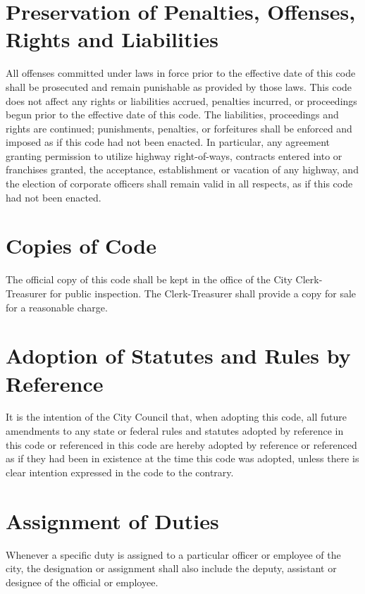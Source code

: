 \section{Preservation of Penalties, Offenses, Rights and Liabilities}
All offenses committed under laws in force prior to the effective date of this code shall be prosecuted and remain punishable as provided by those laws.  This code does not affect any rights or liabilities accrued, penalties incurred, or proceedings begun prior to the effective date of this code.  The liabilities, proceedings and rights are continued; punishments, penalties, or forfeitures shall be enforced and imposed as if this code had not been enacted.  In particular, any agreement granting permission to utilize highway right-of-ways, contracts entered into or franchises granted, the acceptance, establishment or vacation of any highway, and the election of corporate officers shall remain valid in all respects, as if this code had not been enacted.



\section{Copies of Code}
The official copy of this code shall be kept in the office of the City Clerk-Treasurer for public inspection.  The Clerk-Treasurer shall provide a copy for sale for a reasonable charge.



\section{Adoption of Statutes and Rules by Reference}
It is the intention of the City Council that, when adopting this code, all future amendments to any state or federal rules and statutes adopted by reference in this code or referenced in this code are hereby adopted by reference or referenced as if they had been in existence at the time this code was adopted, unless there is clear intention expressed in the code to the contrary.



\section{Assignment of Duties}
Whenever a specific duty is assigned to a particular officer or employee of the city, the designation or assignment shall also include the deputy, assistant or designee of the official or employee.


